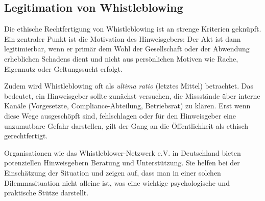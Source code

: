 \documentclass[
    12pt,               %
    a4paper,            %
    ngerman             %
]{scrartcl}
\begin{document}
\subsection{Legitimation von Whistleblowing}
Die ethische Rechtfertigung von Whistleblowing ist an strenge Kriterien geknüpft. Ein zentraler Punkt ist die Motivation des Hinweisgebers: Der Akt ist dann legitimierbar, wenn er primär dem Wohl der Gesellschaft oder der Abwendung erheblichen Schadens dient und nicht aus persönlichen Motiven wie Rache, Eigennutz oder Geltungssucht erfolgt.

Zudem wird Whistleblowing oft als \textit{ultima ratio} (letztes Mittel) betrachtet. Das bedeutet, ein Hinweisgeber sollte zunächst versuchen, die Missstände über interne Kanäle (Vorgesetzte, Compliance-Abteilung, Betriebsrat) zu klären. Erst wenn diese Wege ausgeschöpft sind, fehlschlagen oder für den Hinweisgeber eine unzumutbare Gefahr darstellen, gilt der Gang an die Öffentlichkeit als ethisch gerechtfertigt.

Organisationen wie das Whistleblower-Netzwerk e.V. in Deutschland bieten potenziellen Hinweisgebern Beratung und Unterstützung. Sie helfen bei der Einschätzung der Situation und zeigen auf, dass man in einer solchen Dilemmasituation nicht alleine ist, was eine wichtige psychologische und praktische Stütze darstellt.

\par\noindent %
\end{document}
